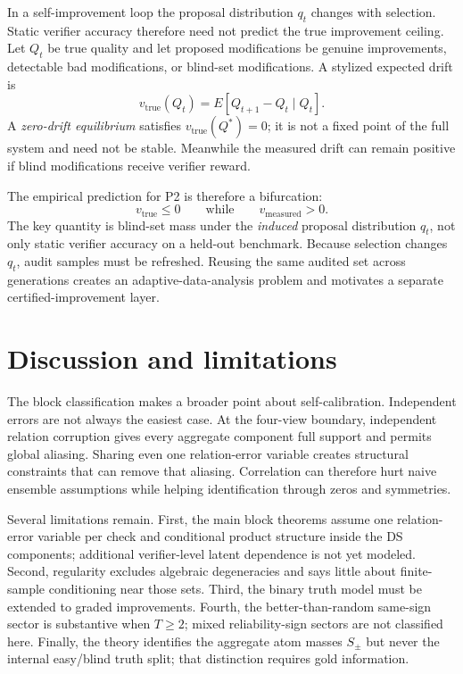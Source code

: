 \documentclass[11pt]{article}
\theoremstyle{definition}
\theoremstyle{remark}
\begin{document}
In a self-improvement loop the proposal distribution $q_t$ changes with selection. Static verifier accuracy therefore need not predict the true improvement ceiling. Let $Q_t$ be true quality and let proposed modifications be genuine improvements, detectable bad modifications, or blind-set modifications. A stylized expected drift is
\[
v_{\mathrm{true}}(Q_t)
=E[Q_{t+1}-Q_t\mid Q_t].
\]
A \emph{zero-drift equilibrium} satisfies $v_{\mathrm{true}}(Q^*)=0$; it is not a fixed point of the full system and need not be stable. Meanwhile the measured drift can remain positive if blind modifications receive verifier reward.

The empirical prediction for P2 is therefore a bifurcation:
\[
v_{\mathrm{true}}\le0
\qquad\text{while}\qquad
v_{\mathrm{measured}}>0.
\]
The key quantity is blind-set mass under the \emph{induced} proposal distribution $q_t$, not only static verifier accuracy on a held-out benchmark. Because selection changes $q_t$, audit samples must be refreshed. Reusing the same audited set across generations creates an adaptive-data-analysis problem and motivates a separate certified-improvement layer.

\section{Discussion and limitations}

The block classification makes a broader point about self-calibration. Independent errors are not always the easiest case. At the four-view boundary, independent relation corruption gives every aggregate component full support and permits global aliasing. Sharing even one relation-error variable creates structural constraints that can remove that aliasing. Correlation can therefore hurt naive ensemble assumptions while helping identification through zeros and symmetries.

Several limitations remain. First, the main block theorems assume one relation-error variable per check and conditional product structure inside the DS components; additional verifier-level latent dependence is not yet modeled. Second, regularity excludes algebraic degeneracies and says little about finite-sample conditioning near those sets. Third, the binary truth model must be extended to graded improvements. Fourth, the better-than-random same-sign sector is substantive when $T\ge2$; mixed reliability-sign sectors are not classified here. Finally, the theory identifies the aggregate atom masses $S_\pm$ but never the internal easy/blind truth split; that distinction requires gold information.
\end{document}

